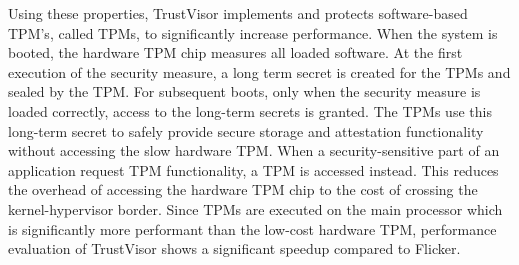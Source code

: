 Using these properties, TrustVisor implements and protects software-based TPM's, called TPMs, to significantly increase performance. When the system is booted, the hardware TPM chip measures all loaded software. At the first execution of the security measure, a long term secret is created for the TPMs and sealed by the TPM. For subsequent boots, only when the security measure is loaded correctly, access to the long-term secrets is granted. The TPMs use this long-term secret to safely provide secure storage and attestation functionality without accessing the slow hardware TPM. When a security-sensitive part of an application request TPM functionality, a TPM is accessed instead. This reduces the overhead of accessing the hardware TPM chip to the cost of crossing the kernel-hypervisor border. Since TPMs are executed on the main processor which is significantly more performant than the low-cost hardware TPM, performance evaluation of TrustVisor shows a significant speedup compared to Flicker.





